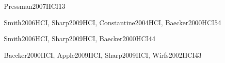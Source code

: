 \begin{syllabus}
\begin{unit}{\PLObjectOrientedProgrammingDef}{}{Pressman2007HCI}{1}{3}
    \begin{topics}%
	 \item \PLObjectOrientedProgrammingTopicObject
	 \item \PLObjectOrientedProgrammingTopicUML
	 \item \PLObjectOrientedProgrammingTopicClasses
	 \item \PLObjectOrientedProgrammingTopicInheritance
	 \item \PLObjectOrientedProgrammingTopicClasshierarchies
	 \item \PLObjectOrientedProgrammingTopicCollection
    \end{topics}%
    \begin{learningoutcomes}%
	 \item \PLObjectOrientedProgrammingObjONE
	 \item \PLObjectOrientedProgrammingObjTWO
	 \item \PLObjectOrientedProgrammingObjFOUR
	 \item \PLObjectOrientedProgrammingObjSEVEN
    \end{learningoutcomes}%
\end{unit}


\begin{unit}{\HCUserCenteredSoftwareDevelopmentDef}{}{Smith2006HCI, Sharp2009HCI, Constantine2004HCI, Baecker2000HCI}{5}{4}
    \HCUserCenteredSoftwareDevelopmentAllTopics
    \HCUserCenteredSoftwareDevelopmentAllObjectives
\end{unit}

\begin{unit}{\HCUserCenteredSoftwareEvaluationDef}{}{Smith2006HCI, Sharp2009HCI, Baecker2000HCI}{4}{4}
    \HCUserCenteredSoftwareEvaluationAllTopics
    \HCUserCenteredSoftwareEvaluationAllObjectives
\end{unit}

\begin{unit}{\HCGUIDesignDef}{}{Baecker2000HCI, Apple2009HCI, Sharp2009HCI, Wirfs2002HCI}{4}{3}
    \HCGUIDesignAllTopics
    \HCGUIDesignAllObjectives
\end{unit}


\end{syllabus}
